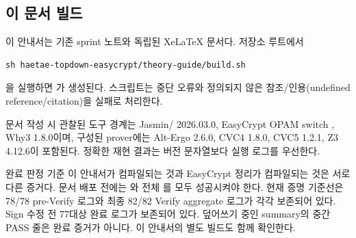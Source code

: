 \subsection{이 문서 빌드}

이 안내서는 기존 sprint 노트와 독립된 XeLaTeX 문서다. 저장소 루트에서

\begin{verbatim}
sh haetae-topdown-easycrypt/theory-guide/build.sh
\end{verbatim}

을 실행하면 가
생성된다. 스크립트는 중단 오류와 정의되지 않은 참조/인용(undefined
reference/citation)을 실패로 처리한다.

문서 작성 시 관찰된 도구 경계는 Jasmin/ 2026.03.0,
EasyCrypt OPAM switch , Why3 1.8.0이며, 구성된
prover에는 Alt-Ergo 2.6.0, CVC4 1.8.0, CVC5 1.2.1, Z3 4.12.6이 포함된다.
정확한 재현 결과는 버전 문자열보다 실행 로그를 우선한다.

\begin{takeaway}{완료 판정 기준}
이 안내서가 컴파일되는 것과 EasyCrypt 정리가 컴파일되는 것은 서로 다른
증거다. 문서 배포 전에는 와 전체
를 모두 성공시켜야 한다. 현재 증명 기준선은
78/78 pre-Verify 로그와 최종 82/82 Verify aggregate 로그가 각각 보존되어 있다.
Sign 수정 전 77대상 완료 로그가 보존되어 있다. 덮어쓰기 중인 summary의 중간
PASS 줄은 완료 증거가 아니다. 이 안내서의 별도 빌드도 함께 확인한다.
\end{takeaway}
